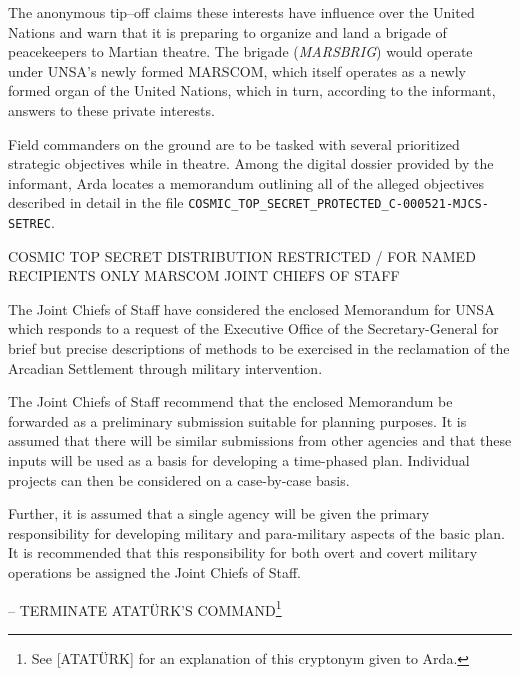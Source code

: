 The anonymous tip--off claims these interests have influence over the United Nations and warn that it is preparing to organize and land a brigade of peacekeepers to Martian theatre. The brigade ({\it MARSBRIG}) would operate under UNSA's newly formed MARSCOM, which itself operates as a newly formed organ of the United Nations, which in turn, according to the informant, answers to these private interests.

Field commanders on the ground are to be tasked with several prioritized strategic objectives while in theatre. Among the digital dossier provided by the informant, Arda locates a memorandum outlining all of the alleged objectives described in detail in the file {\tt COSMIC_TOP_SECRET_PROTECTED_C-000521-MJCS-SETREC}.

\page
\startTimelineCorrespondenceDocument
COSMIC TOP SECRET
DISTRIBUTION RESTRICTED / FOR NAMED RECIPIENTS ONLY
MARSCOM JOINT CHIEFS OF STAFF

\startitemize[n]
    
    \item The Joint Chiefs of Staff have considered the enclosed Memorandum for UNSA which responds to a request of the Executive Office of the Secretary-General for brief but precise descriptions of methods to be exercised in the reclamation of the Arcadian Settlement through military intervention.
    
    \item The Joint Chiefs of Staff recommend that the enclosed Memorandum be forwarded as a preliminary submission suitable for planning purposes. It is assumed that there will be similar submissions from other agencies and that these inputs will be used as a basis for developing a time-phased plan. Individual projects can then be considered on a case-by-case basis.
    
    \item Further, it is assumed that a single agency will be given the primary responsibility for developing military and para-military aspects of the basic plan. It is recommended that this responsibility for both overt and covert military operations be assigned the Joint Chiefs of Staff.
    
\stopitemize

\startitemize[4]

\item {} -- TERMINATE ATATÜRK'S COMMAND\footnote{See [ATATÜRK] for an explanation of this cryptonym given to Arda.}

